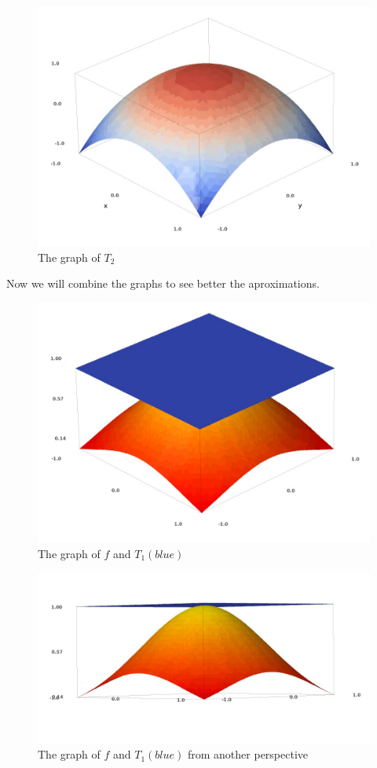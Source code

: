 \documentclass[a4paper,12pt]{article}
\begin{document}
\begin{figure}[H]
    \centering
    \includegraphics[scale=0.357]{2_t2.jpg}
    \caption{The graph of $T_{2}$}
    \label{2_t2}
\end{figure}
\normalfont

\clearpage
Now we will combine the graphs to see better the aproximations.
\begin{figure}[H]
    \centering
    \includegraphics[scale=0.33]{2_f_t1_1.jpg}
    \caption{The graph of $f$ and $T_{1}(blue)$}
    \label{2_f_t1_1}
\end{figure}
\begin{figure}[H]
    \centering
    \includegraphics[scale=0.3]{2_f_t1_2.jpg}
    \caption{The graph of $f$ and $T_{1}(blue)$ from another perspective}
    \label{2_f_t1_2}
\end{figure}
\normalfont
\end{document}

